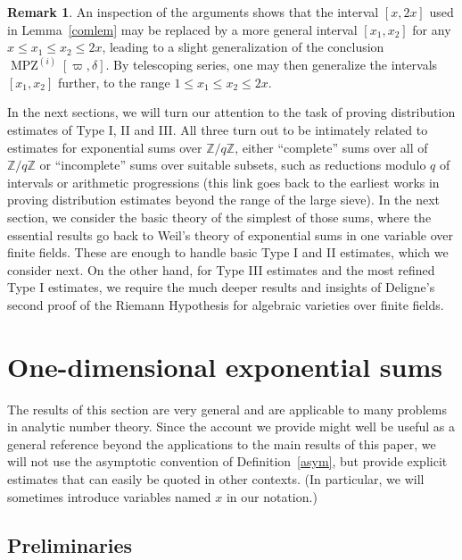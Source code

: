 \documentclass[12pt,a4paper,reqno]{amsart}
\numberwithin{equation}{section}
\DeclareMathOperator*\MPZ{MPZ}
\theoremstyle{plain}
\theoremstyle{definition}
\newtheorem{remark}[theorem]{Remark}
\newcommand\Z{\mathbb{Z}}
\begin{document}
\begin{remark} An inspection of the arguments shows that the interval
  $[x,2x]$ used in Lemma~\ref{comlem} may be replaced by a more general
  interval $[x_1,x_2]$ for any $x \leq x_1 \leq x_2 \leq 2x$, leading
  to a slight generalization of the conclusion
  $\MPZ^{(i)}[\varpi,\delta]$.  By telescoping series, one may then
  generalize the intervals $[x_1,x_2]$ further, to the range $1 \leq
  x_1 \leq x_2 \leq 2x$.
\end{remark}

In the next sections, we will turn our attention to the task of
proving distribution estimates of Type I, II and III.  All three turn
out to be intimately related to estimates for exponential sums over
$\Z/q\Z$, either ``complete'' sums over all of $\Z/q\Z$ or
``incomplete'' sums over suitable subsets, such as reductions modulo
$q$ of intervals or arithmetic progressions (this link goes back to
the earliest works in proving distribution estimates beyond the range
of the large sieve). In the next section, we consider the basic theory
of the simplest of those sums, where the essential results go back to
Weil's theory of exponential sums in one variable over finite
fields. These are enough to handle basic Type I and II estimates,
which we consider next. On the other hand, for Type III estimates and
the most refined Type I estimates, we require the much deeper results
and insights of Deligne's second proof of the Riemann Hypothesis for
algebraic varieties over finite fields.




\section{One-dimensional exponential sums}\label{exp-sec}

The results of this section are very general and are applicable to
many problems in analytic number theory. Since the account we provide
might well be useful as a general reference beyond the applications to
the main results of this paper, we will not use the asymptotic
convention of Definition~\ref{asym}, but provide explicit estimates
that can easily be quoted in other contexts. (In particular, we will
sometimes introduce variables named $x$ in our notation.)

\subsection{Preliminaries}\label{ssec-exp-prelim}
\end{document}
